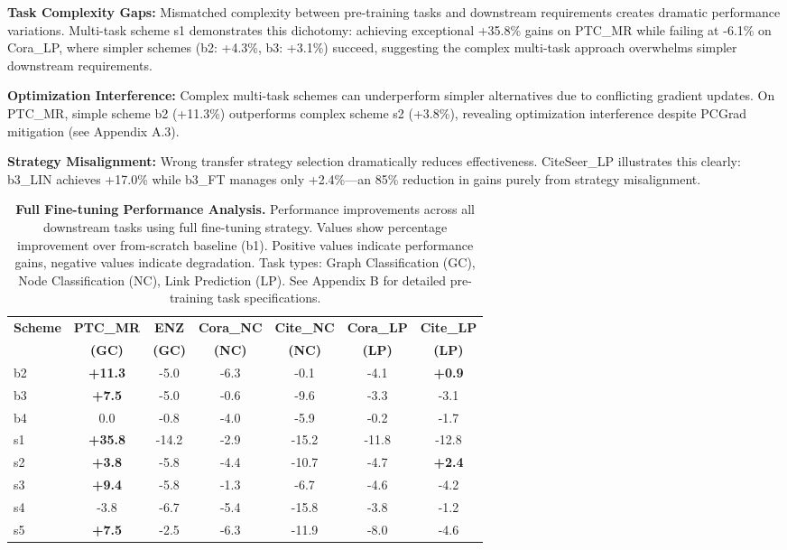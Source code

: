 \documentclass[11pt]{article}
\begin{document}
\textbf{Task Complexity Gaps:} Mismatched complexity between pre-training tasks and downstream requirements creates dramatic performance variations. Multi-task scheme s1 demonstrates this dichotomy: achieving exceptional +35.8\% gains on PTC\_MR while failing at -6.1\% on Cora\_LP, where simpler schemes (b2: +4.3\%, b3: +3.1\%) succeed, suggesting the complex multi-task approach overwhelms simpler downstream requirements.

\textbf{Optimization Interference:} Complex multi-task schemes can underperform simpler alternatives due to conflicting gradient updates. On PTC\_MR, simple scheme b2 (+11.3\%) outperforms complex scheme s2 (+3.8\%), revealing optimization interference despite PCGrad mitigation (see Appendix A.3).

\textbf{Strategy Misalignment:} Wrong transfer strategy selection dramatically reduces effectiveness. CiteSeer\_LP illustrates this clearly: b3\_LIN achieves +17.0\% while b3\_FT manages only +2.4\%—an 85\% reduction in gains purely from strategy misalignment.



\begin{table}[!htb]
\centering
\scriptsize
\setlength{\tabcolsep}{1.5pt}
\renewcommand{\arraystretch}{1.05}
\begin{tabular}{l c c c c c c}
\toprule
\textbf{Scheme} & \textbf{PTC\_MR} & \textbf{ENZ} & \textbf{Cora\_NC} & \textbf{Cite\_NC} & \textbf{Cora\_LP} & \textbf{Cite\_LP} \\
& \textbf{(GC)} & \textbf{(GC)} & \textbf{(NC)} & \textbf{(NC)} & \textbf{(LP)} & \textbf{(LP)} \\
\midrule
b2 & \textbf{+11.3} & -5.0 & -6.3 & -0.1 & -4.1 & \textbf{+0.9} \\
b3 & \textbf{+7.5} & -5.0 & -0.6 & -9.6 & -3.3 & -3.1 \\
b4 & 0.0 & -0.8 & -4.0 & -5.9 & -0.2 & -1.7 \\
s1 & \textbf{+35.8} & -14.2 & -2.9 & -15.2 & -11.8 & -12.8 \\
s2 & \textbf{+3.8} & -5.8 & -4.4 & -10.7 & -4.7 & \textbf{+2.4} \\
s3 & \textbf{+9.4} & -5.8 & -1.3 & -6.7 & -4.6 & -4.2 \\
s4 & -3.8 & -6.7 & -5.4 & -15.8 & -3.8 & -1.2 \\
s5 & \textbf{+7.5} & -2.5 & -6.3 & -11.9 & -8.0 & -4.6 \\
\bottomrule
\end{tabular}
\caption{\textbf{Full Fine-tuning Performance Analysis.} Performance improvements across all downstream tasks using full fine-tuning strategy. Values show percentage improvement over from-scratch baseline (b1). Positive values indicate performance gains, negative values indicate degradation. Task types: Graph Classification (GC), Node Classification (NC), Link Prediction (LP). See Appendix B for detailed pre-training task specifications.}
\label{tab:full-finetune-performance}
\end{table}
\end{document}
